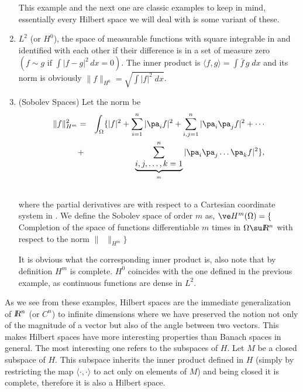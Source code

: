 \begin{enumerate}
This example and the next one are classic examples to keep in mind, essentially every Hilbert space we will deal with is some variant of these.

\item $L^2$ (or $H^0$), the space of measurable functions with square integrable in \re{} and identified with each other if their difference is in a set of measure zero $(f\sim g \mbox{ if }\int |f-g|^2\,dx=0)$. The inner product is $\langle f,g\rangle=\int \bar f \,g\;dx$ and its norm is obviously $\|f\|_{H^0}=\sqrt{\int |f|^2\;dx}$.

\item (Sobolev Spaces)
Let the norm be
\begin{eqnarray*} 
\|f\|^2_{H^m} &=&  \dip\int_{\Omega}\{|f|^2+\sum^n_{i=1}|\pa_i
f|^2+\sum^n_{i,j=1}|\pa_i\pa_jf|^2+\cdots \\
&+&\sum_
{\underbrace{i,j,\ldots,k=1}_m}^n|\pa_i\pa_j\ldots\pa_k f|^2\}, \nonumber \\
\;
\end{eqnarray*}
%
where the partial derivatives are with respect to a Cartesian coordinate system in \ren. We define the Sobolev space of order $m$ as,
$\ve H^m(\Omega)=\{$ Completion of the space of functions differentiable $m$ times in $\Omega\su\ren$ with respect to the norm $\|\;\;\|_{H^m}\}$

It is obvious what the corresponding inner product is, also note that by definition $H^m$ is complete. $H^0$ coincides with the one defined in the previous example, as continuous functions are dense in $L^2$.

\end{enumerate}

As we see from these examples, Hilbert spaces are the immediate generalization of $\mbox{\sl {l$\!\!\!\;\:\!$R}$^n$} $ (or $C^n$) to infinite dimensions where we have preserved the notion not only of the magnitude of a vector but also of the angle between two vectors.
This makes Hilbert spaces have more interesting properties than Banach spaces in general. The most interesting one refers to the subspaces of $H$. Let $M$ be a closed subspace of $H$. This subspace inherits the inner product defined in $H$ (simply by restricting the map $\langle\cdot ,\cdot \rangle$ to act only on elements of $M$) and being closed it is complete, therefore it is also a Hilbert space.
\espa

